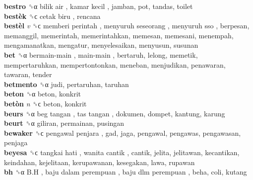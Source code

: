 \textbf{bestro} ␝α   bilik air ,  kamar kecil , jamban, pot, tandas, toilet  \\
\textbf{bestèk} ␝ϲ   cetak biru , rencana  \\
\textbf{bestèl} \emph{v}  ␝ϲ   memberi perintah ,  menyuruh seseorang ,  menyuruh sso , berpesan, memanggil, memerintah, memerintahkan, memesan, memesani, menempah, mengamanatkan, mengatur, menyelesaikan, menyusun, susunan  \\
\textbf{bet} ␝α   bermain-main ,  main-main , bertaruh, lelong, memetik, mempertaruhkan, mempertontonkan, meneban, menjudikan, penawaran, tawaran, tender  \\
\textbf{betmento} ␝α  judi, pertaruhan, taruhan  \\
\textbf{beton} ␝α  beton, konkrit  \\
\textbf{betòn} \emph{n}  ␝ϲ  beton, konkrit  \\
\textbf{beurs} ␝α   beg tangan ,  tas tangan , dokumen, dompet, kantung, karung  \\
\textbf{beurt} ␝α  giliran, permainan, pusingan  \\
\textbf{bewaker} ␝ϲ   pengawal penjara , gad, jaga, pengawal, pengawas, pengawasan, penjaga  \\
\textbf{beyesa} ␝ϲ   tangkai hati ,  wanita cantik , cantik, jelita, jelitawan, kecantikan, keindahan, kejelitaan, kerupawanan, kesegakan, lawa, rupawan  \\
\textbf{bh} ␝α   B.H ,  baju dalam perempuan ,  baju dlm perempuan , beha, coli, kutang  \\
